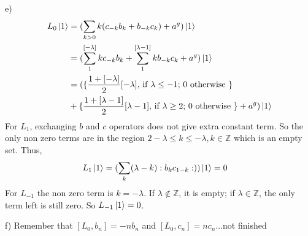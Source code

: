 \documentclass[12pt]{article}
\begin{document}
\begin{paragraph}{e)}
\begin{equation}
\begin{aligned}[t]
L_0\ket{1}&=(\sum\limits_{k>0}k(c_{-k}b_k+b_{-k}c_k)+a^g)\ket{1}\\
&=(\sum\limits_1^{[-\lambda]}kc_{-k}b_k+\sum\limits_1^{[\lambda-1]}kb_{-k}c_k+a^g)\ket{1}\\
&=(\{\frac{1+[-\lambda]}{2}[-\lambda],\,\text{if }\lambda\leq -1;\,0 \text{ otherwise }\}\\
&+\{\frac{1+[\lambda-1]}{2}[\lambda-1],\,\text{if }\lambda\geq 2;\,0 \text{ otherwise }\}+a^g)\ket{1}
\end{aligned}
\end{equation}
For $L_1$, exchanging $b$ and $c$ operators does not give extra constant term. So the only non zero terms are in the region $2-\lambda\leq k\leq -\lambda, k\in \mathbb{Z}$ which is an empty set. Thus,
\begin{equation}
\begin{aligned}[t]
L_1\ket{1}&=(\sum\limits_{k}(\lambda- k):b_{k}c_{1-k}:))\ket{1}=0
\end{aligned}
\end{equation}
For $L_{-1}$ the non zero term is $k=-\lambda$. If $\lambda\not\in\mathbb{Z}$, it is empty; if $\lambda\in\mathbb{Z}$, the only term left is still zero. So $L_{-1}\ket{1}=0$.
\end{paragraph}
\begin{paragraph}{f)}
Remember that $[L_0,b_n]=-nb_n$ and $[L_0,c_n]=nc_n$...not finished
\end{paragraph}
\end{document}
